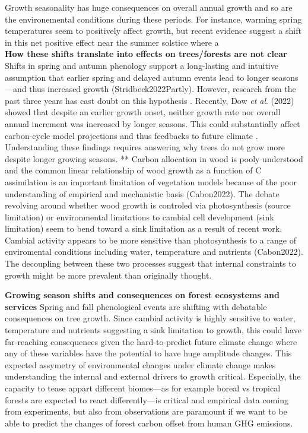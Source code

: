 \documentclass{article}
\begin{document}
Growth seasonality has huge consequences on overall annual growth and so are the environemental conditions during these periods. For instance, warming spring temperatures seem to positively affect growth, but recent evidence suggest a shift in this net positive effect near the summer solstice where a \\
\textbf{How these shifts translate into effects on trees/forests are not clear}
Shifts in spring and autumn phenology support a long-lasting and intuitive assumption that earlier spring and delayed autumn events lead to longer seasons---and thus increased growth \cite{keenan_net_2014} (Stridbeck2022Partly). However, research from the past three years has cast doubt on this hypothesis \cite{dow_warm_2022,green_limits_2022,silvestro_longer_2023}. Recently, Dow \textit{et al}. (2022) showed that despite an earlier growth onset, neither growth rate nor overall annual increment was increased by longer seasons. This could substantially affect carbon-cycle model projections and thus feedbacks to future climate \cite{richardson_climate_2013,swidrak_comparing_2013}. 
Understanding these findings requires answering why trees do not grow more despite longer growing seasons. ** Carbon allocation in wood is pooly understood and the common linear relationship of wood growth as a function of C assimilation is an important limitation of vegetation models because of the poor understanding of empirical and mechanistic basis (Cabon2022). The debate revolving around whether wood growth is controled via photosynthesis (source limitation) or environmental limitations to cambial cell development (sink limitation) seem to bend toward a sink limitation as a result of recent work. Cambial activity appears to be more sensitive than photosynthesis to a range of enviromental conditions including water, temperature and nutrients (Cabon2022). The decoupling between these two processes suggest that internal constraints to growth might be more prevalent than originally thought.

\textbf{Growing season shifts and consequences on forest ecosystems and services}
Spring and fall phenological events are shifting with debatable consequences on tree growth. Since cambial activity is highly sensitive to water, temperature and nutrients suggesting a sink limitation to growth, this could have far-reaching consequences given the hard-to-predict future climate change where any of these variables have the potential to have huge amplitude changes. This expected assymetry of environmental changes under climate change makes understanding the internal and external drivers to growth critical. Especially, the capacity to tease appart different biomes---as for example boreal vs tropical forests are expected to react differently---is critical and empirical data coming from experiments, but also from observations are paramount if we want to be able to predict the changes of forest carbon offset from human GHG emissions.  
\end{document}
